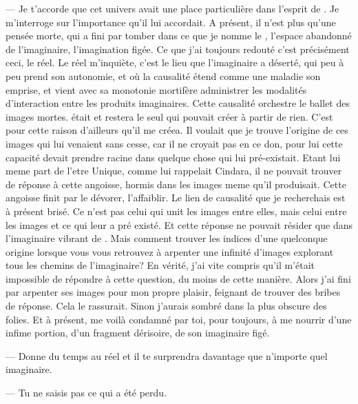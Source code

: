 --- Je t'accorde que cet univers avait une place particulière dans l'esprit de \Mey. Je m'interroge sur l'importance qu'il lui accordait. A présent, il n'est plus qu'une pensée morte, qui a fini par tomber dans ce que je nomme le \reel, l'espace abandonné de l'imaginaire, l'imagination figée.  Ce que j'ai toujours redouté c'est précisément ceci, le réel. Le réel m'inquiète, c'est le lieu que l'imaginaire a déserté, qui peu à peu prend son autonomie, et où la causalité étend comme une maladie son emprise, et vient avec sa monotonie mortifère administrer les modalités d'interaction entre les produits imaginaires. Cette causalité orchestre le ballet des images mortes. \Mey était et restera le seul qui pouvait créer à partir de rien. C'est pour cette raison d'ailleurs qu'il me créea. Il voulait que je trouve l'origine de ces images qui lui venaient sans cesse, car il ne croyait pas en ce don, pour lui cette capacité devait prendre racine dans quelque chose qui lui pré-existait. Etant lui meme part de l'etre Unique, comme lui rappelait Cindara, il ne pouvait trouver de réponse à cette angoisse, hormis dans les images meme qu'il produisait. Cette angoisse finit par le dévorer, l'affaiblir.   Le lien de causalité que je recherchais est à présent brisé. Ce n'est pas celui qui unit les images entre elles, mais celui entre les images et ce qui leur a pré existé. Et cette réponse ne pouvait résider que dans l'imaginaire vibrant de \Mey. Mais comment trouver les indices d'une quelconque origine lorsque vous vous retrouvez à arpenter une infinité d'images explorant tous les chemins de l'imaginaire? En vérité, j'ai vite compris qu'il m'était impossible de répondre à cette question, du moins de cette manière. Alors j'ai fini par arpenter ses images pour mon propre plaisir, feignant de trouver des bribes de réponse. Cela le rassurait. Sinon j'aurais sombré dans la plus obscure des folies. Et à présent, me voilà condamné par toi,  pour toujours, à me nourrir d'une infime portion, d'un fragment dérisoire, de son imaginaire figé.


--- Donne du temps au réel et il te surprendra davantage que n'importe quel imaginaire.

--- Tu ne saisis pas ce qui a été perdu. 


